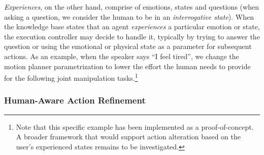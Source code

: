 \documentclass[preprint,3p,times]{elsarticle}
\begin{document}
\emph{Experiences}, on the other hand, comprise of emotions, states and
questions (when asking a question, we consider the human to be in an
\emph{interrogative state}). When the knowledge base states that an agent
\emph{experiences} a particular emotion or state, the execution controller may
decide to handle it, typically by trying to answer the question or using the
emotional or physical state as a parameter for subsequent actions. As an
example, when the speaker says ``I feel tired'', we change the motion planner
parametrization to lower the effort the human needs to provide for the following
joint manipulation tasks.\footnote{Note that this specific example has been
implemented as a proof-of-concept. A broader framework that would support
action alteration based on the user's experienced states remains to be investigated.}

\subsubsection{Human-Aware Action Refinement}\label{sec:action}
\end{document}
